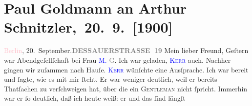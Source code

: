 

         
         \renewcommand{\erwaehntePersonen}{Personen: Marie Glümer, Alfred Kerr, Anna Wendt}
         \renewcommand{\erwaehnteOrte}{Orte: Berlin, Dessauer Straße, Wien}
         \renewcommand{\erwaehnteWerke}{}
               \section[ Paul Goldmann an Arthur Schnitzler, 20. 9. {[}1900{]}]{Paul Goldmann an Arthur Schnitzler, 20. 9. {[}1900{]}}\nopagebreak{}\rehead{ }\normalsize\beginnumbering{} \toendnotes[C]{\smallbreak\pagebreak[2]} 
\toendnotes[C]{\smallbreak}\pstart
           \noindent{}{\pb}\textcolor{pink}{Berlin}{}\ledrightnote{\textcolor{pink}{Berlin}}, 20. September.\hfill \textcolor{pink}{\textcolor{gray}{\textbf{DESSAUERSTRASSE 19}}}{}\ledrightnote{\textcolor{pink}{Dessauer Straße}}\pend
           \pstart
           \centering{}Mein lieber Freund,\pend
           \pstart
           \noindent{}Geſtern war Abendgeſellſchaft bei Frau \textsc{\textcolor{blue}{M.-\textcolor{gray}{G}}{}\ledrightnote{{$\rightarrow$}\textcolor{blue}{Marie Glümer}}}. Ich war geladen, \textsc{\textcolor{blue}{Kerr}{}\ledrightnote{\textcolor{blue}{Alfred Kerr}}} auch. Nachher gingen wir zuſammen nach Hauſe. \textsc{\textcolor{blue}{Kerr}{}\ledrightnote{\textcolor{blue}{Alfred Kerr}}} wünſchte eine Ausſprache. Ich war bereit und ſagte, wie es mit mir ſteht. Er
               war weniger deutlich, weil er bereits Thatſachen zu verſchweigen hat, über die ein
                  \textsc{Gentleman} nicht ſpricht. Immerhin war er ſo deutlich,
               daß ich heute weiß: er und das \label{K_L02932-1v}\label{K_L02932-1h} ſind längſt
